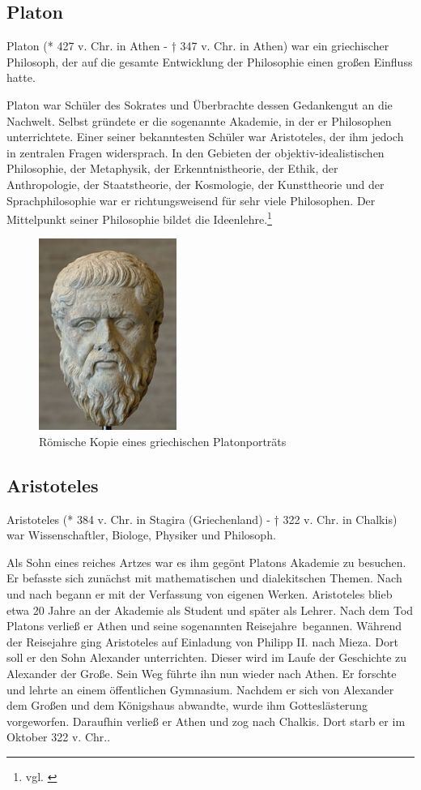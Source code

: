 \subsection{Platon}
Platon (* 427 v.  Chr. in Athen - † 347 v. Chr. in Athen) war ein griechischer Philosoph, der auf die gesamte Entwicklung der Philosophie einen großen Einfluss hatte. 

Platon war Schüler des Sokrates und Überbrachte dessen Gedankengut an die Nachwelt. Selbst gründete er die sogenannte Akademie, in der er Philosophen unterrichtete. Einer seiner bekanntesten Schüler war Aristoteles, der ihm jedoch in zentralen Fragen widersprach.  In den Gebieten der objektiv-idealistischen Philosophie, der Metaphysik, der Erkenntnistheorie, der Ethik, der Anthropologie, der Staatstheorie, der Kosmologie, der Kunsttheorie und der Sprachphilosophie war er richtungsweisend für sehr viele Philosophen. Der Mittelpunkt seiner Philosophie bildet die Ideenlehre.\footnote{vgl. \cite{Platon1} \cite{Platon2}}

\begin{figure}[H]
	\centering 
	\includegraphics[width=0.4\textwidth]{Bilder/kap3/platon} 
	\caption{Römische Kopie eines griechischen Platonporträts\cite{WikiPL}  \label{portraitPlaton}}
\end{figure}

\subsection{Aristoteles}
Aristoteles (* 384 v. Chr. in Stagira (Griechenland) - † 322 v. Chr. in Chalkis) war Wissenschaftler, Biologe, Physiker und Philosoph. 

Als Sohn eines reiches Artzes war es ihm gegönt Platons Akademie zu besuchen. Er befasste sich zunächst mit mathematischen und dialekitschen Themen. Nach und nach begann er mit der Verfassung von eigenen Werken. Aristoteles blieb etwa 20 Jahre an der Akademie als Student und später als Lehrer. Nach dem Tod Platons verließ er Athen und seine sogenannten \glqq Reisejahre\grqq\ begannen. Während der Reisejahre ging Aristoteles auf Einladung von Philipp II. nach Mieza. Dort soll er den Sohn Alexander unterrichten. Dieser wird im Laufe der Geschichte zu Alexander der Große. Sein Weg führte ihn nun wieder nach Athen. Er forschte und lehrte an einem öffentlichen Gymnasium. Nachdem er sich von Alexander dem Großen und dem Königshaus abwandte, wurde ihm Gotteslästerung vorgeworfen. Daraufhin verließ er Athen und zog nach Chalkis. Dort starb er im Oktober 322 v. Chr.. 

